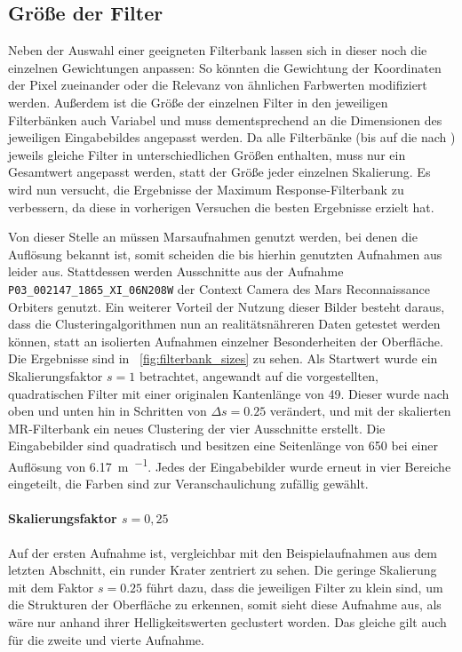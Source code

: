 \subsection{Größe der Filter}
\label{ssec:filtersize}

Neben der Auswahl einer geeigneten Filterbank lassen sich in dieser noch die einzelnen Gewichtungen anpassen: So könnten \zB die Gewichtung der Koordinaten der Pixel zueinander oder die Relevanz von ähnlichen Farbwerten modifiziert werden. Außerdem ist die Größe der einzelnen Filter in den jeweiligen Filterbänken auch Variabel und muss dementsprechend an die Dimensionen des jeweiligen Eingabebildes angepasst werden. Da alle Filterbänke (bis auf die nach \cite{jain_91}) jeweils gleiche Filter in unterschiedlichen Größen enthalten, muss nur ein Gesamtwert angepasst werden, statt der Größe jeder einzelnen Skalierung. Es wird nun versucht, die Ergebnisse der Maximum Response-Filterbank zu verbessern, da diese in vorherigen Versuchen die besten Ergebnisse erzielt hat.

Von dieser Stelle an müssen Marsaufnahmen genutzt werden, bei denen die Auflösung bekannt ist, somit scheiden die bis hierhin genutzten Aufnahmen aus \cite{greeley_13} leider aus. Stattdessen werden Ausschnitte aus der Aufnahme \texttt{P03\_002147\_1865\_XI\_06N208W} der Context Camera des Mars Reconnaissance Orbiters genutzt. Ein weiterer Vorteil der Nutzung dieser Bilder besteht daraus, dass die Clusteringalgorithmen nun an realitätsnähreren Daten getestet werden können, statt an isolierten Aufnahmen einzelner Besonderheiten der Oberfläche. Die Ergebnisse sind in \figurename~\ref{fig:filterbank_sizes} zu sehen. Als Startwert wurde ein Skalierungsfaktor $s=1$ betrachtet, angewandt auf die vorgestellten, quadratischen Filter mit einer originalen Kantenlänge von \SI{49}{\pixel}. Dieser wurde nach oben und unten hin in Schritten von $\Delta s=0.25$ verändert, und mit der skalierten MR-Filterbank ein neues Clustering der vier Ausschnitte erstellt. Die Eingabebilder sind quadratisch und besitzen eine Seitenlänge von \SI{650}{\pixel} bei einer Auflösung von \SI{6,17}{\meter\per\pixel}. Jedes der Eingabebilder wurde erneut in vier Bereiche eingeteilt, die Farben sind zur Veranschaulichung zufällig gewählt.

\paragraph{Skalierungsfaktor $s=0,25$}

Auf der ersten Aufnahme ist, vergleichbar mit den Beispielaufnahmen aus dem letzten Abschnitt, ein runder Krater zentriert zu sehen. Die geringe Skalierung mit dem Faktor $s=0.25$ führt dazu, dass die jeweiligen Filter zu klein sind, um die Strukturen der Oberfläche zu erkennen, somit sieht diese Aufnahme aus, als wäre nur anhand ihrer Helligkeitswerten geclustert worden. Das gleiche gilt auch für die zweite und vierte Aufnahme.


